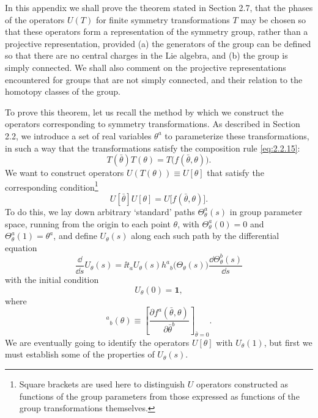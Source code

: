 

In this appendix we shall prove the theorem stated in Section 2.7, that the
phases of the operators $U(T)$ for finite symmetry transformations $T$ may
be chosen so that these operators form a representation of the symmetry
group, rather than a projective representation, provided (a) the generators
of the group can be defined so that there are no central charges in the Lie
algebra, and (b) the group is simply connected. We shall also comment on
the projective representations encountered for groups that are not simply
connected, and their relation to the homotopy classes of the group.

To prove this theorem, let us recall the method by which we construct the
operators corresponding to symmetry transformations. As described in
Section 2.2, we introduce a set of real variables $\theta^a$ to parameterize
these transformations, in such a way that the transformations satisfy the
composition rule \eqref{eq:2.2.15}:
\begin{equation*}
  T(\bar\theta)T(\theta)=T\bigl(f(\bar\theta,\theta)\bigr).
\end{equation*}
We want to construct operators $U(T(\theta))\equiv U[\theta]$ that satisfy
the corresponding condition\footnote{Square brackets are used here to
distinguish $U$ operators constructed as functions of the group parameters
from those expressed as functions of the group transformations themselves.}
\begin{equation}
  U[\bar\theta]U[\theta]=U\bigl[f(\bar\theta,\theta)\bigr].
  \tag{2.B.1}\label{eq:2.B.1}
\end{equation}
To do this, we lay down arbitrary `standard' paths
$\Theta^a_{\theta}(s)$ in group parameter space, running from the origin to
each point $\theta$, with $\Theta^a_{\theta}(0)=0$ and
$\Theta^a_{\theta}(1)=\theta^a$, and define $U_{\theta}(s)$ along each such
path by the differential equation
\begin{equation}
  \frac{\dd}{\dd s}U_{\theta}(s)
    =\ii t_aU_{\theta}(s)h^a{}_{b}\bigl(\Theta_{\theta}(s)\bigr)
      \frac{\dd\Theta^b_{\theta}(s)}{\dd s}
  \tag{2.B.2}\label{eq:2.B.2}
\end{equation}
with the initial condition
\begin{equation}
  U_{\theta}(0)=\mathbf{1},
  \tag{2.B.3}\label{eq:2.B.3}
\end{equation}
where
\begin{equation}
  [h^{-1}]^a{}_{b}(\theta)
    \equiv\left[
      \frac{\partial f^a(\bar\theta,\theta)}{\partial\bar\theta^b}
    \right]_{\bar\theta=0}.
  \tag{2.B.4}\label{eq:2.B.4}
\end{equation}
We are eventually going to identify the operators $U[\theta]$ with
$U_{\theta}(1)$, but first we must establish some of the properties of
$U_{\theta}(s)$.


